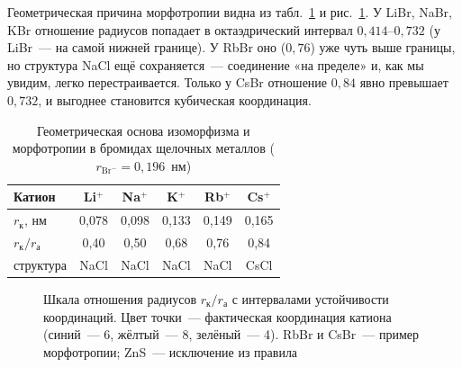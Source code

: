 Геометрическая причина морфотропии видна из табл.~\ref{tab:bromides} и
рис.~\ref{fig:rr-scale}. У LiBr, NaBr, KBr отношение радиусов попадает в
октаэдрический интервал $0{,}414$--$0{,}732$ (у LiBr~— на самой нижней
границе). У RbBr оно ($0{,}76$) уже чуть выше границы, но структура
NaCl ещё сохраняется~— соединение «на пределе» и, как мы увидим, легко
перестраивается. Только у CsBr отношение $0{,}84$ явно превышает
$0{,}732$, и выгоднее становится кубическая координация.

\begin{table}[ht]
\centering
\caption{Геометрическая основа изоморфизма и морфотропии в бромидах
щелочных металлов ($r_{\text{Br}^-}=0{,}196$~нм)}
\label{tab:bromides}
\small
\begin{tabular}{@{}lccccc@{}}
\toprule
Катион & Li$^+$ & Na$^+$ & K$^+$ & Rb$^+$ & Cs$^+$ \\
\midrule
$r_\text{к}$, нм & 0,078 & 0,098 & 0,133 & 0,149 & 0,165 \\
$r_\text{к}/r_\text{а}$ & 0,40 & 0,50 & 0,68 & 0,76 & 0,84 \\
структура & NaCl & NaCl & NaCl & NaCl & CsCl \\
\bottomrule
\end{tabular}
\end{table}

\begin{figure}[ht]
\centering
{}
\caption{Шкала отношения радиусов $r_\text{к}/r_\text{а}$ с интервалами
устойчивости координаций. Цвет точки~— фактическая координация катиона
(синий~— 6, жёлтый~— 8, зелёный~— 4). RbBr и CsBr~— пример морфотропии; ZnS~—
исключение из правила}
\label{fig:rr-scale}
\end{figure}

